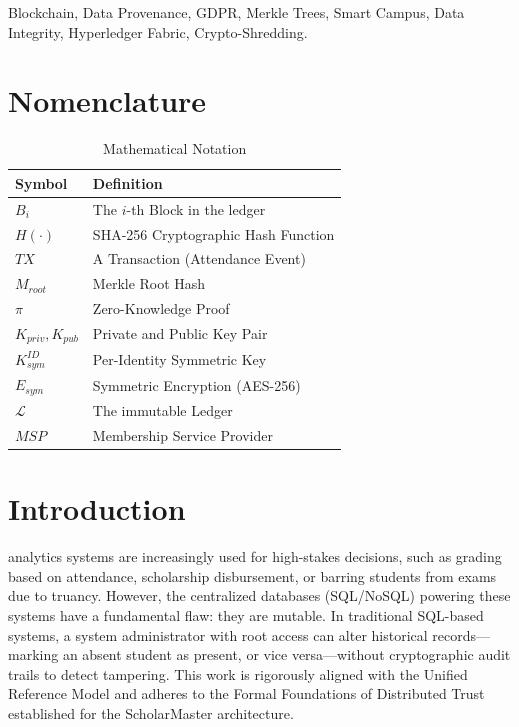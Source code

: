 \documentclass[conference]{IEEEtran}
\begin{document}
\begin{IEEEkeywords}
Blockchain, Data Provenance, GDPR, Merkle Trees, Smart Campus, Data Integrity, Hyperledger Fabric, Crypto-Shredding.
\end{IEEEkeywords}

\section*{Nomenclature}
\begin{table}[h]
\centering
\caption{Mathematical Notation}
\begin{tabular}{ll}
\toprule
\textbf{Symbol} & \textbf{Definition} \\
\midrule
$B_i$ & The $i$-th Block in the ledger \\
$H(\cdot)$ & SHA-256 Cryptographic Hash Function \\
$TX$ & A Transaction (Attendance Event) \\
$M_{root}$ & Merkle Root Hash \\
$\pi$ & Zero-Knowledge Proof \\
$K_{priv}, K_{pub}$ & Private and Public Key Pair \\
$K_{sym}^{ID}$ & Per-Identity Symmetric Key \\
$E_{sym}$ & Symmetric Encryption (AES-256) \\
$\mathcal{L}$ & The immutable Ledger \\
$MSP$ & Membership Service Provider \\
\bottomrule
\end{tabular}
\end{table}

\section{Introduction}
 analytics systems are increasingly used for high-stakes decisions, such as grading based on attendance, scholarship disbursement, or barring students from exams due to truancy. However, the centralized databases (SQL/NoSQL) powering these systems have a fundamental flaw: they are mutable. In traditional SQL-based systems, a system administrator with root access can alter historical records—marking an absent student as present, or vice versa—without cryptographic audit trails to detect tampering. This work is rigorously aligned with the Unified Reference Model \cite{P20} and adheres to the Formal Foundations of Distributed Trust \cite{P21} established for the ScholarMaster architecture.
\end{document}
